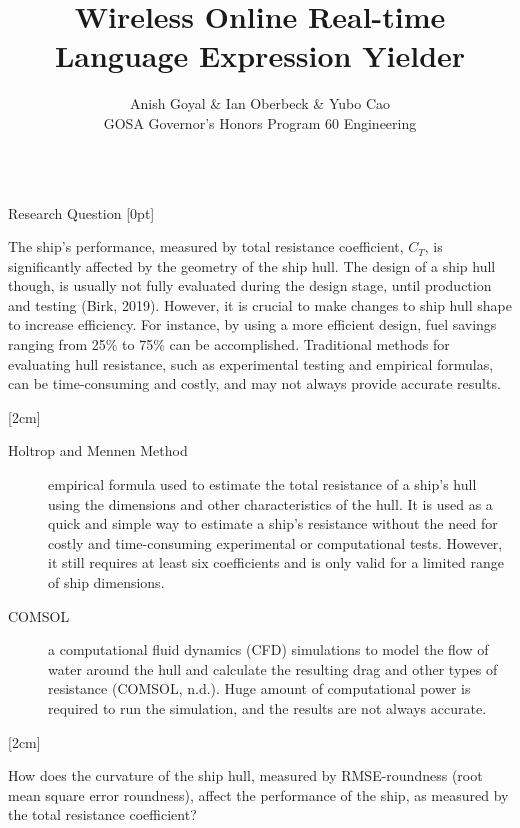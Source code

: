 \documentclass[final, 20pt]{beamer}
\title{Wireless Online Real-time Language Expression Yielder}
\author{Anish Goyal \& Ian Oberbeck \& Yubo Cao\\\normalfont\selectfont GOSA Governor's Honors Program 60 Engineering}
\newlength{\colwidth}
\begin{document}
\begin{frame}[t]
  \centering
  \begin{columns}[t]
    \margincolumn

    \begin{column}{\colwidth}
      \begin{block}{Research Question}
        [0pt]

        The ship's performance, measured by total resistance coefficient, $C_T$, is significantly affected by the geometry of the ship hull. The design of a ship hull though, is usually not fully evaluated during the design stage, until production and testing (Birk, 2019). However, it is crucial to make changes to ship hull shape to increase efficiency. For instance, by using a more efficient design, fuel savings ranging from 25\% to 75\% can be accomplished. Traditional methods for evaluating hull resistance, such as experimental testing and empirical formulas, can be time-consuming and costly, and may not always provide accurate results.

        [2cm]

        \begin{description}
          \item[Holtrop and Mennen Method] empirical formula used to estimate the total resistance of a ship's hull using the dimensions and other characteristics of the hull. It is used as a quick and simple way to estimate a ship's resistance without the need for costly and time-consuming experimental or computational tests. However, it still requires at least six coefficients and is only valid for a limited range of ship dimensions.
          \item[COMSOL] a computational fluid dynamics (CFD) simulations to model the flow of water around the hull and calculate the resulting drag and other types of resistance (COMSOL, n.d.). Huge amount of computational power is required to run the simulation, and the results are not always accurate.
        \end{description}

        [2cm]

        How does the curvature of the ship hull, measured by RMSE-roundness (root mean square error roundness), affect the performance of the ship, as measured by the total resistance coefficient?
      \end{block}

      \vfill


\end{column}
\end{columns}
\end{frame}
\end{document}
